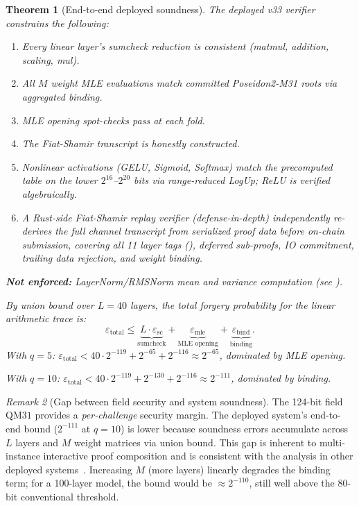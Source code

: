 \documentclass[10pt,twocolumn]{article}
\newtheorem{theorem}{Theorem}[section]
\theoremstyle{definition}
\theoremstyle{remark}
\newtheorem{remark}[theorem]{Remark}
\newcommand{\QM}{\mathrm{QM31}}
\begin{document}
\begin{theorem}[End-to-end deployed soundness]\label{thm:deployed}
  The deployed v33 verifier constrains the following:
  \begin{enumerate}[nosep,leftmargin=1.4em]
    \item[(a)] Every linear layer's sumcheck reduction is
          consistent (matmul, addition, scaling, mul).
    \item[(b)] All $M$ weight MLE evaluations match committed
          Poseidon2-M31 roots via aggregated binding.
    \item[(c)] MLE opening spot-checks pass at each fold.
    \item[(d)] The Fiat-Shamir transcript is honestly
          constructed.
    \item[(e)] Nonlinear activations (GELU, Sigmoid, Softmax) match
          the precomputed table on the lower $2^{16}$--$2^{20}$ bits
          via range-reduced LogUp; ReLU is verified algebraically.
    \item[(f)] A Rust-side Fiat-Shamir replay verifier (defense-in-depth)
          independently re-derives the full channel transcript from
          serialized proof data before on-chain submission, covering
          all 11 layer tags (), deferred sub-proofs,
          IO commitment, trailing data rejection, and weight binding.
  \end{enumerate}
  \textbf{Not enforced:} LayerNorm/RMSNorm mean and variance
  computation (see ).

  By union bound over $L=40$ layers, the total forgery probability
  for the linear arithmetic trace is:
  \begin{equation}\label{eq:combined}
    \varepsilon_{\text{total}} \le
    \underbrace{L \cdot \varepsilon_{\text{sc}}}_{\text{sumcheck}}
    + \underbrace{\varepsilon_{\text{mle}}}_{\text{MLE opening}}
    + \underbrace{\varepsilon_{\text{bind}}}_{\text{binding}}.
  \end{equation}
  With $q=5$: $\varepsilon_{\text{total}} < 40\!\cdot\!2^{-119}
  + 2^{-65} + 2^{-116} \approx 2^{-65}$,
  dominated by MLE opening.

  With $q=10$: $\varepsilon_{\text{total}} <
  40\!\cdot\!2^{-119} + 2^{-130} + 2^{-116}
  \approx 2^{-111}$, dominated by binding.
\end{theorem}

\begin{remark}[Gap between field security and system soundness]
  The 124-bit field $\QM$ provides a \emph{per-challenge}
  security margin.
  The deployed system's end-to-end bound ($2^{-111}$ at $q=10$)
  is lower because soundness errors accumulate across $L$ layers
  and $M$ weight matrices via union bound.
  This gap is inherent to multi-instance interactive proof
  composition and is consistent with the analysis in other
  deployed systems~\cite{thaler2022proofs}.
  Increasing $M$ (more layers) linearly degrades the binding
  term; for a 100-layer model, the bound would be
  $\approx 2^{-110}$, still well above the
  80-bit conventional threshold.
\end{remark}
\end{document}
